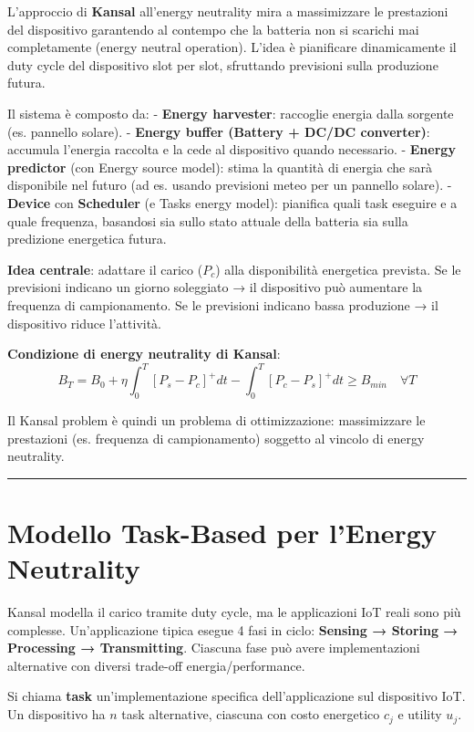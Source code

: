 \documentclass[
  italian,
  openany]{book}
\begin{document}
L'approccio di \textbf{Kansal} all'energy neutrality mira a massimizzare
le prestazioni del dispositivo garantendo al contempo che la batteria
non si scarichi mai completamente (energy neutral operation). L'idea è
pianificare dinamicamente il duty cycle del dispositivo slot per slot,
sfruttando previsioni sulla produzione futura.

Il sistema è composto da: - \textbf{Energy harvester}: raccoglie energia
dalla sorgente (es. pannello solare). - \textbf{Energy buffer (Battery +
DC/DC converter)}: accumula l'energia raccolta e la cede al dispositivo
quando necessario. - \textbf{Energy predictor} (con Energy source
model): stima la quantità di energia che sarà disponibile nel futuro (ad
es. usando previsioni meteo per un pannello solare). - \textbf{Device}
con \textbf{Scheduler} (e Tasks energy model): pianifica quali task
eseguire e a quale frequenza, basandosi sia sullo stato attuale della
batteria sia sulla predizione energetica futura.

\textbf{Idea centrale}: adattare il carico (\(P_c\)) alla disponibilità
energetica prevista. Se le previsioni indicano un giorno soleggiato → il
dispositivo può aumentare la frequenza di campionamento. Se le
previsioni indicano bassa produzione → il dispositivo riduce l'attività.

\textbf{Condizione di energy neutrality di Kansal}:
\[B_T = B_0 + \eta \int_0^T [P_s - P_c]^+ dt - \int_0^T [P_c - P_s]^+ dt \geq B_{min} \quad \forall T\]

Il Kansal problem è quindi un problema di ottimizzazione: massimizzare
le prestazioni (es. frequenza di campionamento) soggetto al vincolo di
energy neutrality.

\begin{center}\rule{0.5\linewidth}{0.5pt}\end{center}

\section{Modello Task-Based per l'Energy
Neutrality}\label{modello-task-based-per-lenergy-neutrality}

Kansal modella il carico tramite duty cycle, ma le applicazioni IoT
reali sono più complesse. Un'applicazione tipica esegue 4 fasi in ciclo:
\textbf{Sensing → Storing → Processing → Transmitting}. Ciascuna fase
può avere implementazioni alternative con diversi trade-off
energia/performance.

Si chiama \textbf{task} un'implementazione specifica dell'applicazione
sul dispositivo IoT. Un dispositivo ha \(n\) task alternative, ciascuna
con costo energetico \(c_j\) e utility \(u_j\).
\end{document}
